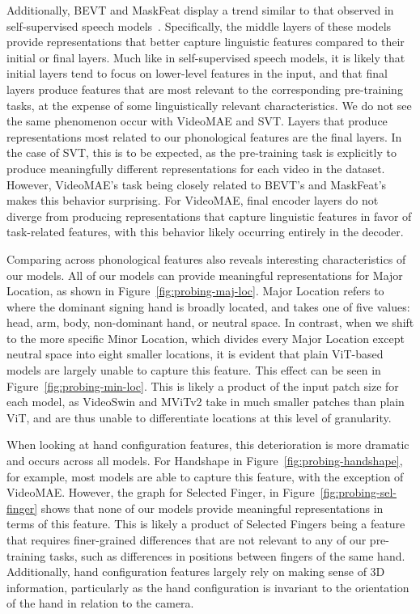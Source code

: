Additionally, BEVT and MaskFeat display a trend similar to that observed in self-supervised speech models~\cite{pasad2021layer}. Specifically, the middle layers of these models provide representations that better capture linguistic features compared to their initial or final layers. Much like in self-supervised speech models, it is likely that initial layers tend to focus on lower-level features in the input, and that final layers produce features that are most relevant to the corresponding pre-training tasks, at the expense of some linguistically relevant characteristics. We do not see the same phenomenon occur with VideoMAE and SVT. Layers that produce representations most related to our phonological features are the final layers. In the case of SVT, this is to be expected, as the pre-training task is explicitly to produce meaningfully different representations for each video in the dataset. However, VideoMAE's task being closely related to BEVT's and MaskFeat's makes this behavior surprising. For VideoMAE, final encoder layers do not diverge from producing representations that capture linguistic features in favor of task-related features, with this behavior likely occurring entirely in the decoder.

Comparing across phonological features also reveals interesting characteristics of our models. All of our models can provide meaningful representations for Major Location, as shown in Figure~\ref{fig:probing-maj-loc}. Major Location refers to where the dominant signing hand is broadly located, and takes one of five values: head, arm, body, non-dominant hand, or neutral space. In contrast, when we shift to the more specific Minor Location, which divides every Major Location except neutral space into eight smaller locations, it is evident that plain ViT-based models are largely unable to capture this feature. This effect can be seen in Figure~\ref{fig:probing-min-loc}. This is likely a product of the input patch size for each model, as VideoSwin and MViTv2 take in much smaller patches than plain ViT, and are thus unable to differentiate locations at this level of granularity.

When looking at hand configuration features, this deterioration is more dramatic and occurs across all models. For Handshape in Figure~\ref{fig:probing-handshape}, for example, most models are able to capture this feature, with the exception of VideoMAE. However, the graph for Selected Finger, in Figure~\ref{fig:probing-sel-finger} shows that none of our models provide meaningful representations in terms of this feature. This is likely a product of Selected Fingers being a feature that requires finer-grained differences that are not relevant to any of our pre-training tasks, such as differences in positions between fingers of the same hand. Additionally, hand configuration features largely rely on making sense of 3D information, particularly as the hand configuration is invariant to the orientation of the hand in relation to the camera.

